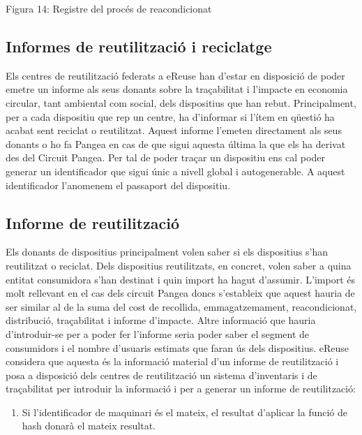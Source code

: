 \documentclass[
]{book}
\providecommand{\tightlist}{%
  \setlength{\itemsep}{0pt}\setlength{\parskip}{0pt}}
\begin{document}
Figura 14: Registre del procés de reacondicionat

\hypertarget{informes-de-reutilitzaciuxf3-i-reciclatge}{%
\subsection{Informes de reutilització i reciclatge}\label{informes-de-reutilitzaciuxf3-i-reciclatge}}

Els centres de reutilització federats a eReuse han d'estar en disposició de poder emetre un
informe als seus donants sobre la traçabilitat i l'impacte en economia circular, tant ambiental
com social, dels dispositius que han rebut. Principalment, per a cada dispositiu que rep un
centre, ha d'informar si l'ítem en qüestió ha acabat sent reciclat o reutilitzat. Aquest informe
l'emeten directament als seus donants o ho fa Pangea en cas de que sigui aquesta última la que
els ha derivat des del Circuit Pangea. Per tal de poder traçar un dispositiu ens cal poder generar
un identificador que sigui únic a nivell global i autogenerable. A aquest identificador
l'anomenem el passaport del dispositiu.

\hypertarget{informe-de-reutilitzaciuxf3}{%
\subsection{Informe de reutilització}\label{informe-de-reutilitzaciuxf3}}

Els donants de dispositius principalment volen saber si els dispositius s'han reutilitzat o reciclat. Dels dispositius reutilitzats, en concret, volen saber a quina entitat consumidora s'han destinat i quin import ha hagut d'assumir. L'import és molt rellevant en el cas dels circuit Pangea doncs s'estableix que aquest hauria de ser similar al de la suma del cost de recollida,
emmagatzemament, reacondicionat, distribució, traçabilitat i informe d'impacte. Altre
informació que hauria d'introduir-se per a poder fer l'informe seria poder saber el segment de
consumidors i el nombre d'usuaris estimats que faran ús dels dispositius.
eReuse considera que aquesta és la informació material d'un informe de reutilització i posa a
disposició dels centres de reutilització un sistema d'inventaris i de traçabilitat per introduir la
informació i per a generar un informe de reutilització:

\begin{enumerate}
\def\labelenumi{\arabic{enumi}.}
\setcounter{enumi}{10}
\tightlist
\item
  Si l'identificador de maquinari és el mateix, el resultat d'aplicar la funció de hash donarà el mateix
  resultat.
\end{enumerate}
\end{document}
